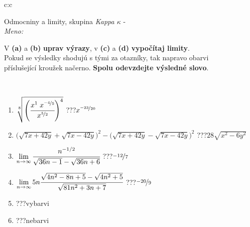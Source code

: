 \documentclass[10pt]{report}
\begin{document}
\newpage
\thispagestyle{empty}
\begin{tabular}{c:c}
\begin{minipage}[c][104.5mm][t]{0.5\linewidth}
\begin{center}
\vspace{7mm}
{\huge Odmocniny a limity, skupina \textit{Kappa $\kappa$} -}\\[5mm]
\textit{Meno:}\phantom{xxxxxxxxxxxxxxxxxxxxxxxxxxxxxxxxxxxxxxxxxxxxxxxxxxxxxxxxxxxxxxxxx}\\[5mm]
\begin{minipage}{0.95\linewidth}
\begin{center}
V \textbf{(a)} a \textbf{(b)} \textbf{uprav výrazy}, v \textbf{(c)} a \textbf{(d)} \textbf{vypočítaj limity}.\\Pokud se výsledky shodujú s tými za otazníky, tak napravo obarvi\\příslušející kroužek načerno. \textbf{Spolu odevzdejte výsledné slovo}.
\end{center}
\end{minipage}
\\[1mm]
\begin{minipage}{0.79\linewidth}
\begin{center}
\begin{varwidth}{\linewidth}
\begin{enumerate}
\small
\item $\sqrt[8]{\left(\cfrac{x^{1}\;x^{\nicefrac{-4}{5}}}{x^{\nicefrac{5}{2}}}\right)^{4}}$\quad \dotfill\; ???\;\dotfill \quad $x^{\nicefrac{-23}{20}}$
\item {\footnotesize{\scriptsize$\big(\sqrt{7x+42y}+\sqrt{7x-42y}\big)^2-\big(\sqrt{7x+42y}-\sqrt{7x-42y}\big)^2$}\quad \dotfill\; ???\;\dotfill \quad $28\sqrt{x^2-6y^2}$}
\item $\lim\limits_{n\to\infty}\cfrac{n^{-1/2}}{\sqrt{36n-1}-\sqrt{36n+6}}$\quad \dotfill\; ???\;\dotfill \quad $\nicefrac{-12}{7}$
\item $\lim\limits_{n\to\infty}5n\cfrac{\sqrt{4n^2-8n+5}-\sqrt{4n^2+5}}{\sqrt{81n^2+3n+7}}$\quad \dotfill\; ???\;\dotfill \quad $\nicefrac{-20}{9}$
\item \quad \dotfill\; ???\;\dotfill \quad vybarvi
\item \quad \dotfill\; ???\;\dotfill \quad nebarvi
\end{enumerate}
\end{varwidth}
\end{center}
\end{minipage}
\begin{minipage}{0.20\linewidth}

\end{minipage}
\end{center}
\end{minipage}
\end{tabular}
\end{document}
